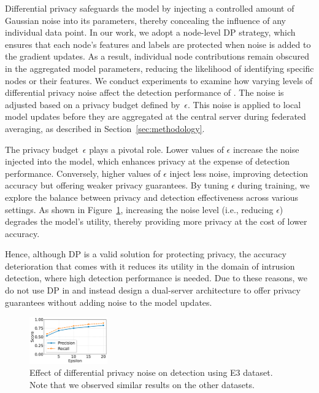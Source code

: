 Differential privacy safeguards the model by injecting a controlled amount of Gaussian noise into its parameters, thereby concealing the influence of any individual data point. In our work, we adopt a node-level DP strategy, which ensures that each node’s features and labels are protected when noise is added to the gradient updates. As a result, individual node contributions remain obscured in the aggregated model parameters, reducing the likelihood of identifying specific nodes or their features. We conduct experiments to examine how varying levels of differential privacy noise affect the detection performance of \Sys. The noise is adjusted based on a privacy budget defined by~$\epsilon$. This noise is applied to local \gnnshort model updates before they are aggregated at the central server during federated averaging, as described in Section~\ref{sec:methodology}.

The privacy budget~$\epsilon$ plays a pivotal role. Lower values of $\epsilon$ increase the noise injected into the model, which enhances privacy at the expense of detection performance. Conversely, higher values of $\epsilon$ inject less noise, improving detection accuracy but offering weaker privacy guarantees. By tuning $\epsilon$ during training, we explore the balance between privacy and detection effectiveness across various settings. As shown in Figure~\ref{epsvsscore}, increasing the noise level (i.e., reducing $\epsilon$) degrades the model’s utility, thereby providing more privacy at the cost of lower accuracy.

Hence, although DP is a valid solution for protecting privacy, the accuracy deterioration that comes with it reduces its utility in the domain of intrusion detection, where high detection performance is needed. Due to these reasons, we do not use DP in \Sys and instead design a dual-server architecture to offer privacy guarantees without adding noise to the model updates.

\begin{figure}[!t]
  \centering
  \includegraphics[width=0.3\textwidth]{fig/epsvsscore.pdf}
  \caption{Effect of differential privacy noise on detection using E3 dataset. Note that we observed similar results on the other datasets.}
  \label{epsvsscore}
  \vspace{-2ex}
\end{figure}

